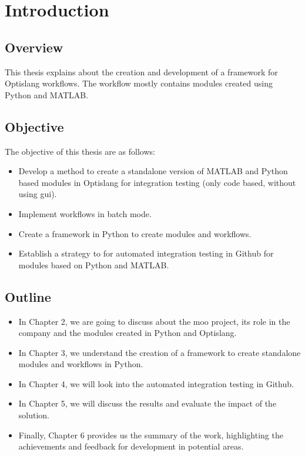 \chapter{Introduction}
\section{Overview}
This thesis explains about the creation and development of a framework for Optislang workflows. The workflow mostly contains modules created using Python and
MATLAB.


\section{Objective}
The objective of this thesis are as follows:
\begin{itemize}
    \item Develop a method to create a standalone version of MATLAB and Python based modules in Optislang for integration testing (only code based, without using 
    \acrshort{gui}).
    \item Implement workflows in batch mode.
    \item Create a framework in Python to create modules and workflows.
    \item Establish a strategy to for automated integration testing in Github for modules based on Python and MATLAB. 
\end{itemize}

\section{Outline}
\begin{itemize}
    \item   In Chapter 2, we are going to discuss about the \acrshort{moo} project, its role in the company and the modules created in Python and Optislang.
    \item   In Chapter 3, we understand the creation of a framework to create standalone modules and workflows in Python.
    \item   In Chapter 4, we will look into the automated integration testing in Github.
    \item   In Chapter 5, we will discuss the results and evaluate the impact of the solution.
    \item   Finally, Chapter 6 provides us the summary of the work, highlighting the achievements and feedback for development in potential areas.
\end{itemize}